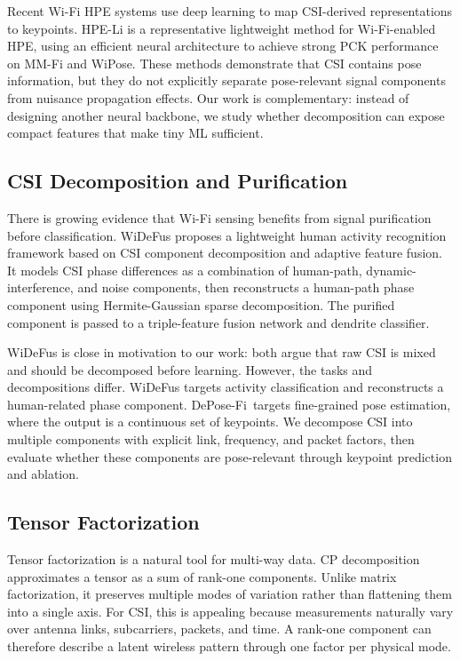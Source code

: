 \documentclass[letterpaper]{article}
\newcommand{\method}{DePose-Fi}
\begin{document}
Recent Wi-Fi HPE systems use deep learning to map CSI-derived representations to keypoints. HPE-Li is a representative lightweight method for Wi-Fi-enabled HPE, using an efficient neural architecture to achieve strong PCK performance on MM-Fi and WiPose. These methods demonstrate that CSI contains pose information, but they do not explicitly separate pose-relevant signal components from nuisance propagation effects. Our work is complementary: instead of designing another neural backbone, we study whether decomposition can expose compact features that make tiny ML sufficient.

\subsection{CSI Decomposition and Purification}

There is growing evidence that Wi-Fi sensing benefits from signal purification before classification. WiDeFus proposes a lightweight human activity recognition framework based on CSI component decomposition and adaptive feature fusion. It models CSI phase differences as a combination of human-path, dynamic-interference, and noise components, then reconstructs a human-path phase component using Hermite-Gaussian sparse decomposition. The purified component is passed to a triple-feature fusion network and dendrite classifier.

WiDeFus is close in motivation to our work: both argue that raw CSI is mixed and should be decomposed before learning. However, the tasks and decompositions differ. WiDeFus targets activity classification and reconstructs a human-related phase component. \method\ targets fine-grained pose estimation, where the output is a continuous set of keypoints. We decompose CSI into multiple components with explicit link, frequency, and packet factors, then evaluate whether these components are pose-relevant through keypoint prediction and ablation.

\subsection{Tensor Factorization}

Tensor factorization is a natural tool for multi-way data. CP decomposition approximates a tensor as a sum of rank-one components. Unlike matrix factorization, it preserves multiple modes of variation rather than flattening them into a single axis. For CSI, this is appealing because measurements naturally vary over antenna links, subcarriers, packets, and time. A rank-one component can therefore describe a latent wireless pattern through one factor per physical mode.
\end{document}
